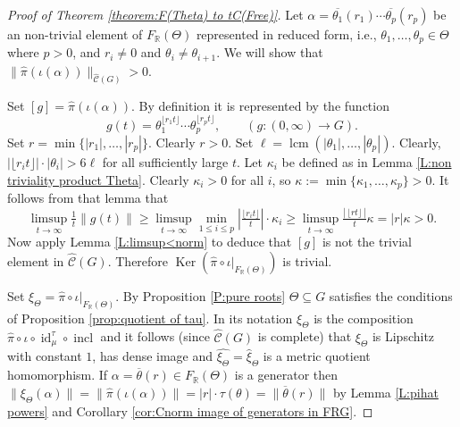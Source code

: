 \documentclass[12pt]{amsart}
\theoremstyle{definition}
\def\RR{\ensuremath{\mathbb{R}}}
\def\incl{\operatorname{incl}}
\newcommand{\C}[1]{\mathcal{#1}}
\newcommand{\OP}[1]{\operatorname{#1}}
\def\Free{F}
\def\tC{\hat{\mathcal{C}}}
\newcommand{\Myfloor}[1]{\lfloor #1 \rfloor}
\begin{document}
\begin{proof}[Proof of Theorem \ref{theorem:F(Theta) to tC(Free)}]
Let $\alpha=\overline{\theta_1}(r_1) \cdots \overline{\theta_p}(r_p)$ be an non-trivial element of $\Free_\RR(\Theta)$ represented in reduced form, i.e., $\theta_1,\dots,\theta_p \in \Theta$ where $p>0$, and $r_i \neq 0$ and $\theta_i \neq \theta_{i+1}$.
We will show that $\|\hat{\pi}(\iota(\alpha))\|_{\tC(G)}>0$.


Set $[g]=\hat{\pi}(\iota(\alpha))$.
By definition it is represented by the function %
\[
g(t) = \theta_1^{\Myfloor{r_1t}}  \cdots \theta_p^{\Myfloor{r_pt}}, \qquad (g \colon (0,\infty) \to G).
\]
Set $r=\min\{|r_1|,\dots,|r_p|\}$.
Clearly $r>0$.
Set $\ell=\OP{lcm}(|\theta_1|,\dots,|\theta_p|)$.
Clearly, $|\Myfloor{r_it}| \cdot |\theta_i| > 6\ell$ for all sufficiently large $t$. %
Let $\kappa_i$ be defined as in Lemma \ref{L:non triviality product Theta}.
Clearly $\kappa_i >0$ for all $i$, so $\kappa := \min\{ \kappa_1,\dots,\kappa_p\} >0$.
It follows from that lemma that 
\[
\limsup_{t\to \infty} \tfrac{1}{t} \|g(t)\| 
\geq \limsup_{t \to \infty} \min_{1 \leq i \leq p} \left|\tfrac{\Myfloor{r_it}}{t}\right| \cdot \kappa_i 
\geq \limsup_{t \to \infty} \tfrac{| \, \Myfloor{rt}\,|}{t} \kappa = |r| \kappa >0.
\]
Now apply Lemma \ref{L:limsup<norm} to deduce that $[g]$ is not the trivial element in $\tC(G)$.
Therefore $\OP{Ker}(\hat{\pi} \circ \iota|_{\Free_\RR(\Theta)})$ is trivial.


Set $\xi_\Theta=\hat{\pi} \circ \iota|_{\Free_\RR(\Theta)}$.
By Proposition \ref{P:pure roots} $\Theta \subseteq G$ satisfies the conditions of Proposition \ref{prop:quotient of tau}.
In its notation $\xi_\Theta$ is the composition $\hat{\pi} \circ \iota \circ \OP{id}^\tau_\mu \circ \incl$ and it follows (since $\tC(G)$ is complete) that $\xi_\Theta$ is Lipschitz with constant $1$, has dense image and $\widehat{\xi_\Theta} =\hat{\xi}_\Theta$ is a metric quotient homomorphism.
If $\alpha=\overline{\theta}(r) \in \Free_\RR(\Theta)$ is a generator then $\|\xi_\Theta(\alpha)\| =\| \hat{\pi}(\iota(\alpha))\| = |r| \cdot \tau(\theta) = \|\overline{\theta}(r)\|$ by Lemma \ref{L:pihat powers} and Corollary \ref{cor:Cnorm image of generators in FRG}.
\end{proof}
\end{document}
